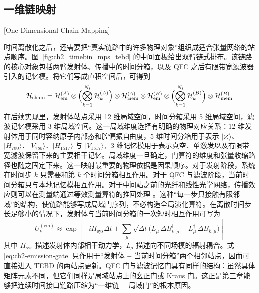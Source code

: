 \subsection{一维链映射}[One-Dimensional Chain Mapping]

时间离散化之后，还需要把“真实链路中的许多物理对象”组织成适合张量网络的站点顺序。图~\ref{fig:ch2_timebin_mps_tebd} 的中间面板给出双臂链式排布。该链路的核心对象包括两臂发射体、传播中的时间分箱，以及 QFC 之后有限带宽滤波器引入的记忆模。将它们写成直积空间后，可得到
\begin{equation}
\mathcal H_{\mathrm{chain}}
=
\mathcal H_{\mathrm{em}}^{(A)}\otimes
\Bigl(\bigotimes_{k=1}^{N_t}\mathcal H_{k}^{(A)}\Bigr)\otimes
\mathcal H_{\mathrm{mem}}^{(A)}\otimes
\mathcal H_{\mathrm{em}}^{(B)}\otimes
\Bigl(\bigotimes_{k=1}^{N_t}\mathcal H_{k}^{(B)}\Bigr)\otimes
\mathcal H_{\mathrm{mem}}^{(B)}
\label{eq:ch2-chain-space}
\end{equation}
在后续实现里，发射体站点采用 12 维局域空间，时间分箱采用 5 维局域空间，滤波记忆模采用 3 维局域空间。这一局域维度选择有明确的物理对应关系：12 维发射体用于同时容纳原子内部态和腔偏振自由度，5 维时间分箱用于表示 $|\varnothing\rangle$、$|H_{780}\rangle$、$|V_{780}\rangle$、$|H_{1517}\rangle$ 与 $|V_{1517}\rangle$，3 维记忆模用于表示真空、单激发以及有限带宽滤波保留下来的主要相干记忆。局域维度一旦确定，门算符的维度和张量收缩路径也随之固定下来。这一映射最重要的物理依据是因果顺序。对于发射阶段，系统在时间步 $k$ 只需要和第 $k$ 个时间分箱相互作用。对于 QFC 与滤波阶段，当前时间分箱只与本地记忆模相互作用。对于中间站之前的光纤和线性光学网络，传播效应则可以在测量端通过等效测量算符的推回处理 \cite{Pichler2016TimeDelaysMPS,Guimond2017DelayedCoherentFeedbackMPS,ArranzRegidor2021WaveguideQED}。这种“每一步只接触有限邻域”的结构，使链路能够写成局域门序列，不必构造全局演化算符。在离散时间步长足够小的情况下，发射体与当前时间分箱的一次短时相互作用可写为
\begin{equation}
U_k^{\mathrm{(em)}}\approx
\exp\!\left[
-iH_{\mathrm{sys}}\Delta t
+
\sum_{\mu}
\sqrt{\Delta t}
\bigl(
L_{\mu}\,\Delta B_{k,\mu}^{\dagger}
-
L_{\mu}^{\dagger}\,\Delta B_{k,\mu}
\bigr)
\right]
\label{eq:ch2-emission-gate}
\end{equation}
其中 $H_{\mathrm{sys}}$ 描述发射体内部相干动力学，$L_{\mu}$ 描述向不同场模的辐射耦合。式 \eqref{eq:ch2-emission-gate} 只作用于“发射体 $+$ 当前时间分箱”两个相邻站点，因而可直接进入 TEBD 的两站点更新。QFC 门与滤波记忆门具有同样的结构：虽然具体矩阵元素不同，但它们同样是局域站点上的幺正门或 Kraus 门。这正是第三章能够把连续时间接口链路压缩为“一维链 $+$ 局域门”的根本原因。

